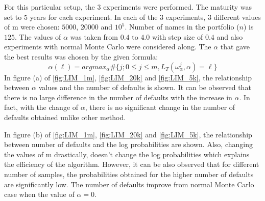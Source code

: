 For this particular setup, the 3 experiments were performed. The maturity was set to 5 years for each experiment. In each of the 3 experiments, 3 different values of m were chosen: $5000$, $20000$ and $10^{5}$. Number of names in the portfolio ($n$) is $125$. The values of $\alpha$ was taken from $0.4$ to $4.0$ with step size of $0.4$ and also experiments with normal Monte Carlo were considered along. The $\alpha$ that gave the best results was chosen by the given formula:
\begin{equation}
\alpha(\ell) = argmax_{\alpha} \# \{ j; 0 \leq j \leq m, L_{T}(\omega_{\alpha}^{j},\alpha) = \ell \}
\end{equation}  
In figure (a) of \ref{fig:LIM_1m}, \ref{fig:LIM_20k} and \ref{fig:LIM_5k}, the relationship between $\alpha$ values and the number of defaults is shown. It can be observed that there is no large difference in the number of defaults with the increase in $\alpha$. In fact, with the change of $\alpha$, there is no significant change in the number of defaults obtained unlike other method. 

In figure (b) of \ref{fig:LIM_1m}, \ref{fig:LIM_20k} and \ref{fig:LIM_5k}, the relationship between number of defaults and the log probabilities are shown. Also, changing the values of m drastically, doesn't change the log probabilities which explains the efficiency of the algorithm. However, it can be also observed that for different number of samples, the probabilities obtained for the higher number of defaults are significantly low. The number of defaults improve from normal Monte Carlo case when the value of $\alpha=0$. 